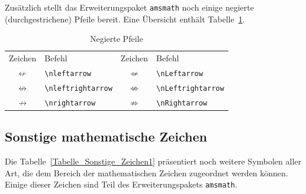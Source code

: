 \documentclass[a4paper,10pt,twoside]{scrbook}
\begin{document}
{Zusätzlich stellt das Erweiterungspaket \verb!amsmath! noch einige negierte (durchgestrichene) 
Pfeile bereit. Eine Übersicht enthält Tabelle~\ref{Tabelle_Negierte_Pfeile}.

\begin{table}[h!tb]
\centering
\caption{Negierte Pfeile}
\label{Tabelle_Negierte_Pfeile}       %
\begin{tabular}{clcl}
\hline
Zeichen & Befehl & Zeichen & Befehl \\
$\nleftarrow$ & \texttt{\textbackslash nleftarrow} & 
$\nLeftarrow$ & \texttt{\textbackslash nLeftarrow} \\
$\nleftrightarrow$ & \texttt{\textbackslash nleftrightarrow} &
$\nLeftrightarrow$ & \texttt{\textbackslash nLeftrightarrow} \\
$\nrightarrow$ & \texttt{\textbackslash nrightarrow} &
$\nRightarrow$ & \texttt{\textbackslash nRightarrow} \\
\hline
\end{tabular}
\end{table}


\subsection{Sonstige mathematische Zeichen}

Die Tabelle~\ref{Tabelle_Sonstige_Zeichen1} präsentiert noch weitere
Symbolen aller Art, die dem Bereich der mathematischen Zeichen zugeordnet werden können. Einige dieser Zeichen 
sind Teil des Erweiterungspakets \verb!amsmath!.

}
\end{document}
